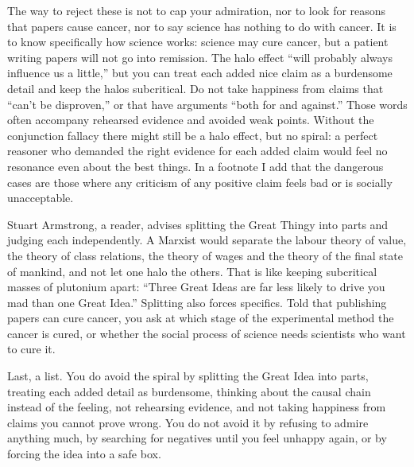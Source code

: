 The way to reject these is not to cap your admiration, nor to look for reasons that papers cause cancer, nor to say science has nothing to do with cancer. It is to know specifically how science works: science may cure cancer, but a patient writing papers will not go into remission. The halo effect ``will probably always influence us a little,'' but you can treat each added nice claim as a burdensome detail and keep the halos subcritical. Do not take happiness from claims that ``can't be disproven,'' or that have arguments ``both for and against.'' Those words often accompany rehearsed evidence and avoided weak points. Without the conjunction fallacy there might still be a halo effect, but no spiral: a perfect reasoner who demanded the right evidence for each added claim would feel no resonance even about the best things. In a footnote I add that the dangerous cases are those where any criticism of any positive claim feels bad or is socially unacceptable.

Stuart Armstrong, a reader, advises splitting the Great Thingy into parts and judging each independently. A Marxist would separate the labour theory of value, the theory of class relations, the theory of wages and the theory of the final state of mankind, and not let one halo the others. That is like keeping subcritical masses of plutonium apart: ``Three Great Ideas are far less likely to drive you mad than one Great Idea.''  Splitting also forces specifics. Told that publishing papers can cure cancer, you ask at which stage of the experimental method the cancer is cured, or whether the social process of science needs scientists who want to cure it.

Last, a list. You do avoid the spiral by splitting the Great Idea into parts, treating each added detail as burdensome, thinking about the causal chain instead of the feeling, not rehearsing evidence, and not taking happiness from claims you cannot prove wrong. You do not avoid it by refusing to admire anything much, by searching for negatives until you feel unhappy again, or by forcing the idea into a safe box. 
